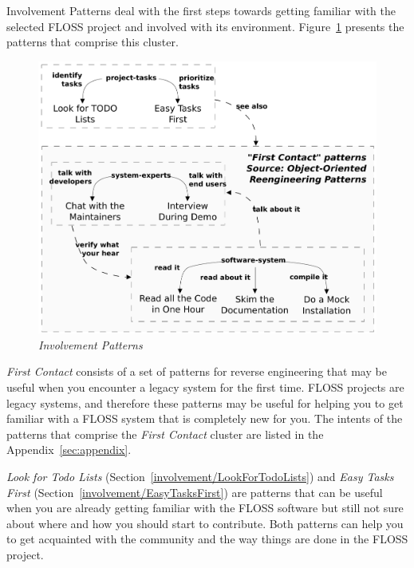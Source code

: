\documentclass[12pt]{article}
\begin{document}
Involvement Patterns deal with the first steps towards getting familiar with the selected 
FLOSS project and involved with its environment.
Figure~\ref{fig:involvement} presents the patterns that comprise this cluster.
\begin{figure}[hbt]
  \begin{center}
    \includegraphics[width=\textwidth]{figures/involvement}
  \end{center}
  \caption{\textit{Involvement Patterns}}
  \label{fig:involvement}
\end{figure}

\textit{First Contact} \cite{demeyer2008} consists of a set of patterns for reverse engineering 
that may be useful when you encounter a legacy system for the first time.  
FLOSS projects are legacy systems, and therefore  these patterns may  be useful for helping 
you to get familiar with a FLOSS system that is completely new for you. 
The intents of the patterns that comprise the \textit{First Contact} cluster 
are listed in the Appendix~\ref{sec:appendix}.

\textit{Look for Todo Lists} (Section~\ref{involvement/LookForTodoLists}) and 
\textit{Easy Tasks First} (Section~\ref{involvement/EasyTasksFirst}) are
patterns that can be useful when you are already getting familiar with the FLOSS 
software but still not sure about where and how you should start to contribute.
Both patterns can help you to get acquainted with the community and 
the way things are done in the FLOSS project.



\end{document}
